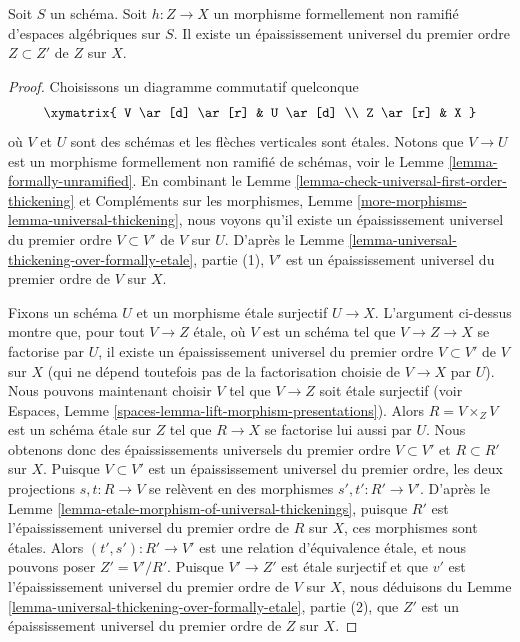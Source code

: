 \begin{lemma}
\label{lemma-universal-thickening}
Soit $S$ un schéma.
Soit $h : Z \to X$ un morphisme formellement non ramifié d'espaces
algébriques sur $S$.
Il existe un épaississement universel du premier ordre $Z \subset Z'$ de
$Z$ sur $X$.
\end{lemma}

\begin{proof}
Choisissons un diagramme commutatif quelconque
$$
\xymatrix{
V \ar[d] \ar[r] & U \ar[d] \\
Z \ar[r] & X
}
$$
où $V$ et $U$ sont des schémas et les flèches verticales sont étales.
Notons que $V \to U$ est un morphisme formellement non ramifié de schémas, voir le
Lemme \ref{lemma-formally-unramified}.
En combinant le
Lemme \ref{lemma-check-universal-first-order-thickening}
et
Compléments sur les morphismes, Lemme \ref{more-morphisms-lemma-universal-thickening},
nous voyons qu'il existe un épaississement universel du premier ordre $V \subset V'$
de $V$ sur $U$. D'après le
Lemme \ref{lemma-universal-thickening-over-formally-etale}, partie (1),
$V'$ est un épaississement universel du premier ordre de $V$ sur $X$.

\medskip\noindent
Fixons un schéma $U$ et un morphisme étale surjectif $U \to X$.
L'argument ci-dessus montre que, pour tout $V \to Z$ étale, où $V$ est
un schéma tel que $V \to Z \to X$ se factorise par $U$, il existe un
épaississement universel du premier ordre $V \subset V'$ de $V$ sur $X$
(qui ne dépend toutefois pas de la factorisation choisie de $V \to X$
par $U$). Nous pouvons maintenant choisir $V$ tel que $V \to Z$ soit étale
surjectif (voir
Espaces, Lemme \ref{spaces-lemma-lift-morphism-presentations}).
Alors $R = V \times_Z V$ est un schéma étale sur $Z$ tel que
$R \to X$ se factorise lui aussi par $U$.
Nous obtenons donc des épaississements universels du premier ordre
$V \subset V'$ et $R \subset R'$ sur $X$.
Puisque $V \subset V'$ est un épaississement universel du premier ordre,
les deux projections $s, t : R \to V$ se relèvent en des morphismes
$s', t': R' \to V'$. D'après le
Lemme \ref{lemma-etale-morphism-of-universal-thickenings},
puisque $R'$ est l'épaississement universel du premier ordre de $R$ sur $X$,
ces morphismes sont étales.
Alors $(t', s') : R' \to V'$ est une relation d'équivalence étale,
et nous pouvons poser $Z' = V'/R'$. Puisque $V' \to Z'$ est étale surjectif
et que $v'$ est l'épaississement universel du premier ordre de $V$ sur $X$,
nous déduisons du
Lemme \ref{lemma-universal-thickening-over-formally-etale}, partie (2),
que $Z'$ est un épaississement universel du premier ordre de $Z$ sur $X$.
\end{proof}

